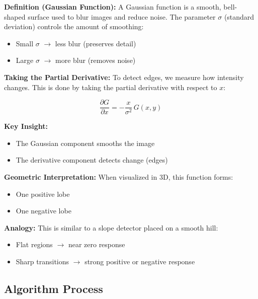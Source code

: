 \documentclass[12pt]{article}
\begin{document}
\textbf{Definition (Gaussian Function):}
A Gaussian function is a smooth, bell-shaped surface used to blur images and reduce noise. The parameter $\sigma$ (standard deviation) controls the amount of smoothing:
\begin{itemize}
    \item Small $\sigma$ $\rightarrow$ less blur (preserves detail)
    \item Large $\sigma$ $\rightarrow$ more blur (removes noise)
\end{itemize}

\textbf{Taking the Partial Derivative:}
To detect edges, we measure how intensity changes. This is done by taking the partial derivative with respect to $x$:

\[
    \frac{\partial G}{\partial x} = -\frac{x}{\sigma^2} \, G(x,y)
\]

\textbf{Key Insight:}
\begin{itemize}
    \item The Gaussian component smooths the image
    \item The derivative component detects change (edges)
\end{itemize}

\textbf{Geometric Interpretation:}
When visualized in 3D, this function forms:
\begin{itemize}
    \item One positive lobe
    \item One negative lobe
\end{itemize}

\textbf{Analogy:}
This is similar to a slope detector placed on a smooth hill:
\begin{itemize}
    \item Flat regions $\rightarrow$ near zero response
    \item Sharp transitions $\rightarrow$ strong positive or negative response
\end{itemize}

\subsection{Algorithm Process}
\end{document}

